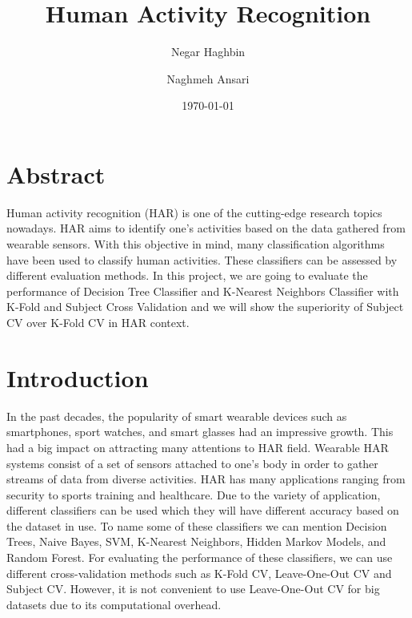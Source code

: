 \documentclass[12pt, a4paper]{article}
\title{Human Activity Recognition} %
\author{
    Negar Haghbin\\
    \and
    Naghmeh Ansari\\
  }
\date{\small \today}
\begin{document}
\setcounter{page}{1} %
\maketitle
\thispagestyle{empty}
\section{Abstract} 
Human activity recognition (HAR) is one of the cutting-edge research topics nowadays. HAR aims to identify one’s activities based on the data gathered from wearable sensors. With this objective in mind, many classification algorithms have been used to classify human activities. These classifiers can be assessed by different evaluation methods. In this project, we are going to evaluate the performance of Decision Tree Classifier and K-Nearest Neighbors Classifier with K-Fold and Subject Cross Validation and we will show the superiority of Subject CV over K-Fold CV in HAR context. 

\section{Introduction}
In the past decades, the popularity of smart wearable devices such as smartphones, sport watches, and smart glasses had an impressive growth. This had a big impact on attracting many attentions to HAR field. Wearable HAR systems consist of a set of sensors attached to one's body in order to gather streams of data from diverse activities. HAR has many applications ranging from security to sports training and healthcare.
Due to the variety of application, different classifiers can be used which they will have different accuracy based on the dataset in use. To name some of these classifiers we can mention Decision Trees, Naive Bayes, SVM, K-Nearest Neighbors, Hidden Markov Models, and Random Forest. For evaluating the performance of these classifiers, we can use different cross-validation methods such as K-Fold CV,  Leave-One-Out CV and Subject CV. However, it is not convenient to use Leave-One-Out CV for big datasets due to its computational overhead.
\end{document}
